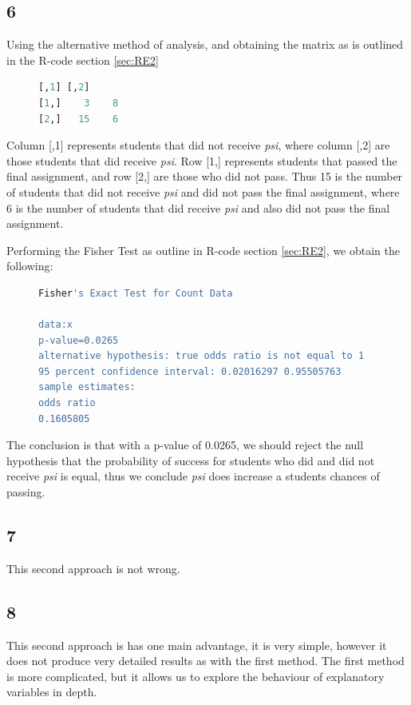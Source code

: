 \documentclass{article}
\begin{document}
    \subsection*{6}
    Using the alternative method of analysis, and obtaining the matrix as is outlined in the R-code section \ref{sec:RE2}
        	\begin{figure}[H]
    	\begin{lstlisting}[language=R]
     [,1] [,2]
[1,]    3    8
[2,]   15    6
    	\end{lstlisting}
    \end{figure}
    Column [,1] represents students that did not receive \textit{psi}, where column [,2] are those students that did receive \textit{psi}. Row [1,] represents students that passed the final assignment, and row [2,] are those who did not pass. Thus 15 is the number of students that did not receive \textit{psi} and did not pass the final assignment, where 6 is the number of students that did receive \textit{psi} and also did not pass the final assignment.
    
    Performing the Fisher Test as outline in R-code section \ref{sec:RE2}, we obtain the following:
            	\begin{figure}[H]
    	\begin{lstlisting}[language=R]
	Fisher's Exact Test for Count Data

data:x
p-value=0.0265
alternative hypothesis: true odds ratio is not equal to 1
95 percent confidence interval: 0.02016297 0.95505763
sample estimates:
odds ratio 
0.1605805 
    	\end{lstlisting}
    \end{figure}
    The conclusion is that with a p-value of 0.0265, we should reject the null hypothesis that the probability of success for students who did and did not receive \textit{psi} is equal, thus we conclude \textit{psi} does increase a students chances of passing.
    \subsection*{7}
    This second approach is not wrong.
    \subsection*{8}
	This second approach is has one main advantage, it is very simple, however it does not produce very detailed results as with the first method. The first method is more complicated, but it allows us to explore the behaviour of explanatory variables in depth.
\end{document}
